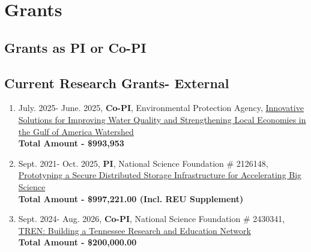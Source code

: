\section{Grants}

\subsection{Grants as PI or Co-PI}

\hspace{2em}

\subsection{Current Research Grants- External}
\begin{enumerate}


\item July. 2025- June. 2025, \textbf{Co-PI}, Environmental Protection Agency, \href{}{Innovative Solutions for Improving Water 
Quality and Strengthening Local Economies in the Gulf of America Watershed}
\\ \textbf{ Total Amount - \$993,953}


\item Sept. 2021- Oct. 2025, \textbf{PI}, National Science Foundation \# 2126148, \href{https://www.nsf.gov/awardsearch/showAward?AWD_ID=2126148}{Prototyping a Secure Distributed Storage Infrastructure for Accelerating Big Science}
\\ \textbf{ Total Amount - \$997,221.00 (Incl. REU Supplement)}


\item Sept. 2024- Aug. 2026, \textbf{Co-PI}, National Science Foundation \# 2430341, \href{https://www.nsf.gov/awardsearch/showAward?AWD_ID=2430341}{TREN: Building a Tennessee Research and Education Network}
\\ \textbf{ Total Amount - \$200,000.00}





\end{enumerate}
